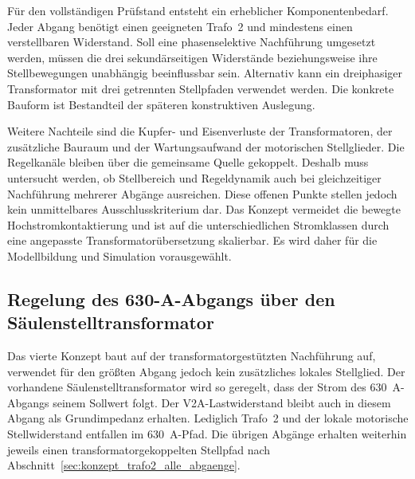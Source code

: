 Für den vollständigen Prüfstand entsteht ein erheblicher Komponentenbedarf.
Jeder Abgang benötigt einen geeigneten Trafo~2 und mindestens einen
verstellbaren Widerstand. Soll eine phasenselektive Nachführung umgesetzt
werden, müssen die drei sekundärseitigen Widerstände beziehungsweise ihre
Stellbewegungen unabhängig beeinflussbar sein. Alternativ kann ein
dreiphasiger Transformator mit drei getrennten Stellpfaden verwendet werden.
Die konkrete Bauform ist Bestandteil der späteren konstruktiven Auslegung.

Weitere Nachteile sind die Kupfer- und Eisenverluste der Transformatoren,
der zusätzliche Bauraum und der Wartungsaufwand der motorischen Stellglieder.
Die Regelkanäle bleiben über die gemeinsame Quelle gekoppelt. Deshalb muss
untersucht werden, ob Stellbereich und Regeldynamik auch bei gleichzeitiger
Nachführung mehrerer Abgänge ausreichen. Diese offenen Punkte stellen jedoch
kein unmittelbares Ausschlusskriterium dar. Das Konzept vermeidet die
bewegte Hochstromkontaktierung und ist auf die unterschiedlichen Stromklassen
durch eine angepasste Transformatorübersetzung skalierbar. Es wird daher für
die Modellbildung und Simulation vorausgewählt.


\subsection{Regelung des 630-A-Abgangs über den Säulenstelltransformator}
\label{sec:konzept_saeulentrafo_630}

Das vierte Konzept baut auf der transformatorgestützten Nachführung auf,
verwendet für den größten Abgang jedoch kein zusätzliches lokales
Stellglied. Der vorhandene Säulenstelltransformator wird so geregelt, dass
der Strom des \SI{630}{\ampere}-Abgangs seinem Sollwert folgt. Der
V2A-Lastwiderstand bleibt auch in diesem Abgang als Grundimpedanz erhalten.
Lediglich Trafo~2 und der lokale motorische Stellwiderstand entfallen im
\SI{630}{\ampere}-Pfad. Die übrigen Abgänge erhalten weiterhin jeweils einen
transformatorgekoppelten Stellpfad nach
Abschnitt~\ref{sec:konzept_trafo2_alle_abgaenge}.

